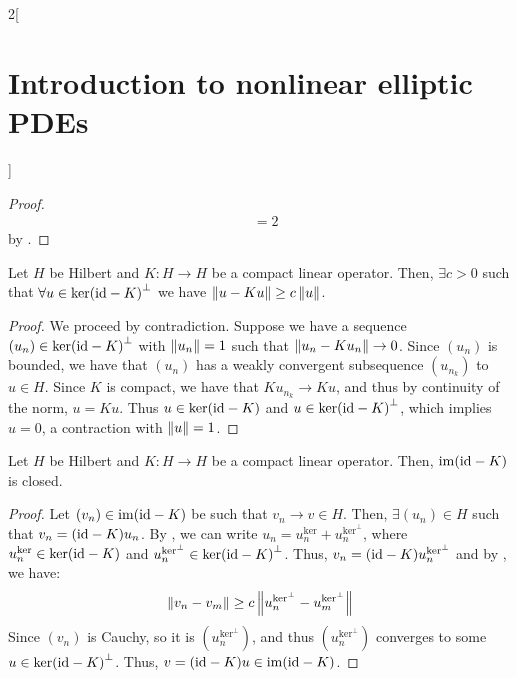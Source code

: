 \documentclass[../../../main_math.tex]{subfiles}
\begin{document}
\begin{multicols}{2}[\section{Introduction to nonlinear elliptic PDEs}]
\begin{proof}
\begin{align*}
        & =2
    \end{align*}
    by .
  \end{proof}
  \begin{lemma}\label{INEPDE:lemma2_fredholm}
    Let $H$ be Hilbert and $K:H\to H$ be a compact linear operator. Then, $\exists c>0$ such that $\forall u\in {\ker(\mathrm{id}-K)}^{\perp}$ we have $\left\|u-Ku\right\|\geq c\left\|u\right\|$.
  \end{lemma}
  \begin{proof}
    We proceed by contradiction. Suppose we have a sequence $(u_n)\in {\ker(\mathrm{id}-K)}^{\perp}$ with $\left\|u_n\right\|=1$ such that $\left\|u_n-Ku_n\right\|\to 0$. Since $(u_n)$ is bounded, we have that $(u_n)$ has a weakly convergent subsequence $(u_{n_k})$ to $u\in H$. Since $K$ is compact, we have that $Ku_{n_k}\to Ku$, and thus by continuity of the norm, $u=Ku$. Thus $u\in \ker(\mathrm{id}-K)$ and $u\in {\ker(\mathrm{id}-K)}^{\perp}$, which implies $u=0$, a contraction with $\left\|u\right\|=1$.
  \end{proof}
  \begin{lemma}\label{INEPDE:lemma3_fredholm}
    Let $H$ be Hilbert and $K:H\to H$ be a compact linear operator. Then, $\operatorname{im}(\mathrm{id}-K)$ is closed.
  \end{lemma}
  \begin{proof}
    Let $(v_n)\in \operatorname{im}(\mathrm{id}-K)$ be such that $v_n\to v\in H$. Then, $\exists (u_n)\in H$ such that $v_n=(\mathrm{id}-K)u_n$. By , we can write $u_n=u_n^{\text{ker}}+ u_n^{\text{ker}^\perp}$, where $u_n^{\text{ker}}\in \ker(\mathrm{id}-K)$ and $u_n^{\text{ker}^\perp}\in {\ker(\mathrm{id}-K)}^{\perp}$. Thus, $v_n=(\mathrm{id}-K)u_n^{\text{ker}^\perp}$ and by , we have:
    $$
      \left\|v_n-v_m\right\|\geq c\left\|u_n^{\text{ker}^\perp}-u_m^{\text{ker}^\perp}\right\|
    $$
    Since $(v_n)$ is Cauchy, so it is $(u_n^{\text{ker}^\perp})$, and thus $(u_n^{\text{ker}^\perp})$ converges to some $u\in {\ker(\mathrm{id}-K)}^{\perp}$. Thus, $v=(\mathrm{id}-K)u\in \operatorname{im}(\mathrm{id}-K)$.
  \end{proof}
  \begin{theorem}

\end{theorem}
\end{multicols}
\end{document}
